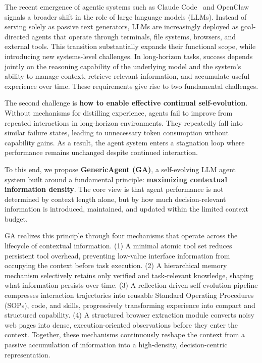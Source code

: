 The recent emergence of agentic systems such as Claude Code~\citep{claudecode} and OpenClaw~\citep{openclaw_rl} signals a broader shift in the role of large language models (LLMs).
Instead of serving solely as passive text generators, LLMs are increasingly deployed as goal-directed agents that operate through terminals, file systems, browsers, and external tools.
This transition substantially expands their functional scope, while introducing new systems-level challenges.
In long-horizon tasks, success depends jointly on the reasoning capability of the underlying model and the system’s ability to manage context, retrieve relevant information, and accumulate useful experience over time.
These requirements give rise to two fundamental challenges.

The second challenge is \textbf{how to enable effective continual self-evolution}.
Without mechanisms for distilling experience, agents fail to improve from repeated interactions in long-horizon environments.
They repeatedly fall into similar failure states, leading to unnecessary token consumption without capability gains.
As a result, the agent system enters a stagnation loop where performance remains unchanged despite continued interaction.


To this end, we propose \textbf{GenericAgent (GA)}, a self-evolving LLM agent system built around a fundamental principle: \textbf{maximizing contextual information density}. 
The core view is that agent performance is not determined by context length alone, but by how much decision-relevant information is introduced, maintained, and updated within the limited context budget.

GA realizes this principle through four mechanisms that operate across the lifecycle of contextual information. 
(1) A minimal atomic tool set reduces persistent tool overhead, preventing low-value interface information from occupying the context before task execution. 
(2) A hierarchical memory mechanism selectively retains only verified and task-relevant knowledge, shaping what information persists over time. 
(3) A reflection-driven self-evolution pipeline compresses interaction trajectories into reusable Standard Operating Procedures (SOPs), code, and skills, progressively transforming experience into compact and structured capability. 
(4) A structured browser extraction module converts noisy web pages into dense, execution-oriented observations before they enter the context. 
Together, these mechanisms continuously reshape the context from a passive accumulation of information into a high-density, decision-centric representation. 

